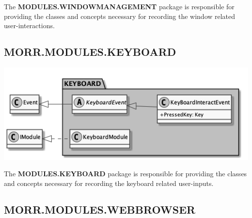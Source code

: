 The \textbf{MODULES.WINDOWMANAGEMENT} package is responsible for providing the classes and concepts necessary for recording the window related user-interactions.

\begin{packclass}
\end{packclass}
\newpage
\subsection*{MORR.MODULES.KEYBOARD}

\begin{center}
    \includegraphics[width=1.0\textwidth]{resources/Packages/MODULES_KEYBOARD.png}
\end{center}

The \textbf{MODULES.KEYBOARD} package is responsible for providing the classes and concepts necessary for recording the keyboard related user-inputs.

\begin{packclass}
\end{packclass}

\newpage
\subsection*{MORR.MODULES.WEBBROWSER}

